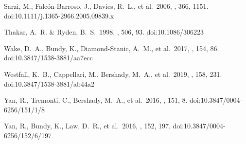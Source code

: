 \documentclass{aastex631}
\begin{document}
\begin{thebibliography}{}
 Sarzi, M., Falc{\'o}n-Barroso, J., Davies, R.~L., et al.\ 2006, \mnras, 366, 1151. doi:10.1111/j.1365-2966.2005.09839.x

 Thakar, A.~R. \& Ryden, B.~S.\ 1998, \apj, 506, 93. doi:10.1086/306223

 Wake, D.~A., Bundy, K., Diamond-Stanic, A.~M., et al.\ 2017, \aj, 154, 86. doi:10.3847/1538-3881/aa7ecc

 Westfall, K.~B., Cappellari, M., Bershady, M.~A., et al.\ 2019, \aj, 158, 231. doi:10.3847/1538-3881/ab44a2

 Yan, R., Tremonti, C., Bershady, M.~A., et al.\ 2016, \aj, 151, 8. doi:10.3847/0004-6256/151/1/8

 Yan, R., Bundy, K., Law, D.~R., et al.\ 2016, \aj, 152, 197. doi:10.3847/0004-6256/152/6/197

\end{thebibliography}
\end{document}
